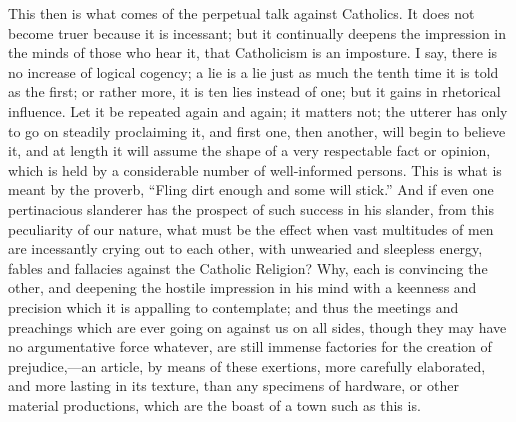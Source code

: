 This then is what comes of the perpetual talk against
Catholics. It does not become truer because it is
incessant; but it continually deepens the impression in
the minds of those who hear it, that Catholicism is an
imposture. I say, there is no increase of logical
cogency; a lie is a lie just as much the tenth time it is
told as the first; or rather more, it is ten lies instead
of one; but it gains in rhetorical influence. Let it be
repeated again and again; it matters not; the utterer has
only to go on steadily proclaiming it, and first one,
then another, will begin to believe it, and at length it
will assume the shape of a very respectable fact or
opinion, which is held by a considerable number of
well-informed persons. This is what is meant by the
proverb, ``Fling dirt enough and some will
stick.'' And if even one pertinacious slanderer has
the prospect of such success in his slander, from this
peculiarity of our nature, what must be the effect when
vast multitudes of men are incessantly crying out to each
other, with unwearied and sleepless energy, fables and
fallacies against the Catholic Religion? Why, each is
convincing the other, and deepening the hostile
impression in his mind with a keenness and precision
which it is appalling to contemplate; and thus the
meetings and preachings which are ever going on against
us on all sides, though they may have no argumentative
force whatever, are still immense factories for the
creation of prejudice,—an article, by means of these
exertions, more carefully elaborated, and more lasting in
its texture, than any specimens of hardware, or other
material productions, which are the boast of a town such
as this is.

